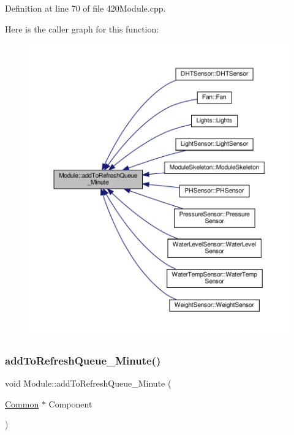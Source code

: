 Definition at line 70 of file 420\+Module.\+cpp.

Here is the caller graph for this function\+:
\nopagebreak
\begin{figure}[H]
\begin{center}
\leavevmode
\includegraphics[width=350pt]{class_module_a20d1125116f9a8c71339fde4626c5adb_icgraph}
\end{center}
\end{figure}
\mbox{\label{class_module_a20d1125116f9a8c71339fde4626c5adb}} 
\subsubsection{\texorpdfstring{add\+To\+Refresh\+Queue\+\_\+\+Minute()}{addToRefreshQueue\_Minute()}\hspace{0.1cm}{\footnotesize\ttfamily [2/2]}}
{\footnotesize\ttfamily void Module\+::add\+To\+Refresh\+Queue\+\_\+\+Minute (\begin{DoxyParamCaption}\item[{\hyperlink{class_common}{Common} $\ast$}]{Component }\end{DoxyParamCaption})}

